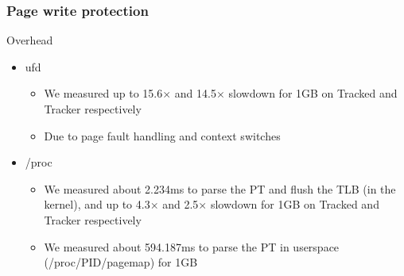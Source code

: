 \documentclass[xcolor=table,bigger,unknownkeysallowed]{beamer}
\begin{document}
        \begin{frame}
			\frametitle{Page write protection} 
				\begin{block}{Overhead}
					\begin{itemize}
						\item ufd 
						\begin{itemize}
							\item We measured up to 15.6$\times$ and 14.5$\times$ slowdown for 1GB on Tracked and Tracker respectively
							\item Due to page fault handling and context switches
						\end{itemize}
						\item /proc 
						\begin{itemize}
							\item We measured about 2.234ms to parse the PT and flush the TLB (in the kernel), and up to 4.3$\times$ and 2.5$\times$ slowdown for 1GB on Tracked and Tracker respectively
							\item We measured about 594.187ms to parse the PT in userspace (/proc/PID/pagemap) for 1GB				
						\end{itemize}					
					\end{itemize}
				\end{block}				
			\end{frame}                   
\end{document}
